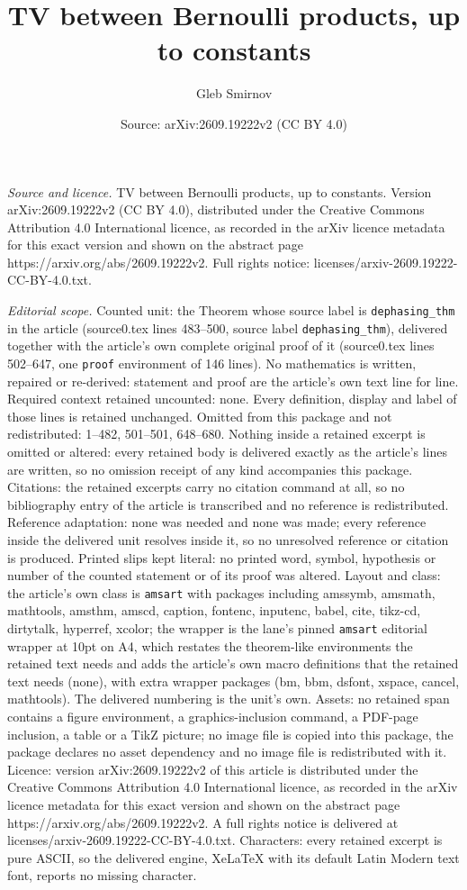 \documentclass[10pt,a4paper]{amsart}
\title[TV between Bernoulli products, up to constants]{TV between Bernoulli products, up to constants}
\author{Gleb Smirnov}
\date{Source: arXiv:2609.19222v2 (CC BY 4.0)}
\begin{document}
\maketitle

\noindent\emph{Source and licence.} TV between Bernoulli products, up to constants. Version arXiv:2609.19222v2 (CC BY 4.0), distributed under the Creative Commons Attribution 4.0 International licence, as recorded in the arXiv licence metadata for this exact version and shown on the abstract page https://arxiv.org/abs/2609.19222v2. Full rights notice: licenses/arxiv-2609.19222-CC-BY-4.0.txt.\par\smallskip

\noindent\textit{Editorial scope.} Counted unit: the Theorem whose source label is \texttt{dephasing\_thm} in the article (source0.tex lines 483--500, source label \texttt{dephasing\_thm}), delivered together with the article's own complete original proof of it (source0.tex lines 502--647, one \texttt{proof} environment of 146 lines). No mathematics is written, repaired or re-derived: statement and proof are the article's own text line for line. Required context retained uncounted: none. Every definition, display and label of those lines is retained unchanged. Omitted from this package and not redistributed: 1--482, 501--501, 648--680. Nothing inside a retained excerpt is omitted or altered: every retained body is delivered exactly as the article's lines are written, so no omission receipt of any kind accompanies this package. Citations: the retained excerpts carry no citation command at all, so no bibliography entry of the article is transcribed and no reference is redistributed. Reference adaptation: none was needed and none was made; every reference inside the delivered unit resolves inside it, so no unresolved reference or citation is produced. Printed slips kept literal: no printed word, symbol, hypothesis or number of the counted statement or of its proof was altered. Layout and class: the article's own class is \texttt{amsart} with packages including amssymb, amsmath, mathtools, amsthm, amscd, caption, fontenc, inputenc, babel, cite, tikz-cd, dirtytalk, hyperref, xcolor; the wrapper is the lane's pinned \texttt{amsart} editorial wrapper at 10pt on A4, which restates the theorem-like environments the retained text needs and adds the article's own macro definitions that the retained text needs (none), with extra wrapper packages (bm, bbm, dsfont, xspace, cancel, mathtools). The delivered numbering is the unit's own. Assets: no retained span contains a figure environment, a graphics-inclusion command, a PDF-page inclusion, a table or a TikZ picture; no image file is copied into this package, the package declares no asset dependency and no image file is redistributed with it. Licence: version arXiv:2609.19222v2 of this article is distributed under the Creative Commons Attribution 4.0 International licence, as recorded in the arXiv licence metadata for this exact version and shown on the abstract page https://arxiv.org/abs/2609.19222v2. A full rights notice is delivered at licenses/arxiv-2609.19222-CC-BY-4.0.txt. Characters: every retained excerpt is pure ASCII, so the delivered engine, XeLaTeX with its default Latin Modern text font, reports no missing character.
\end{document}
